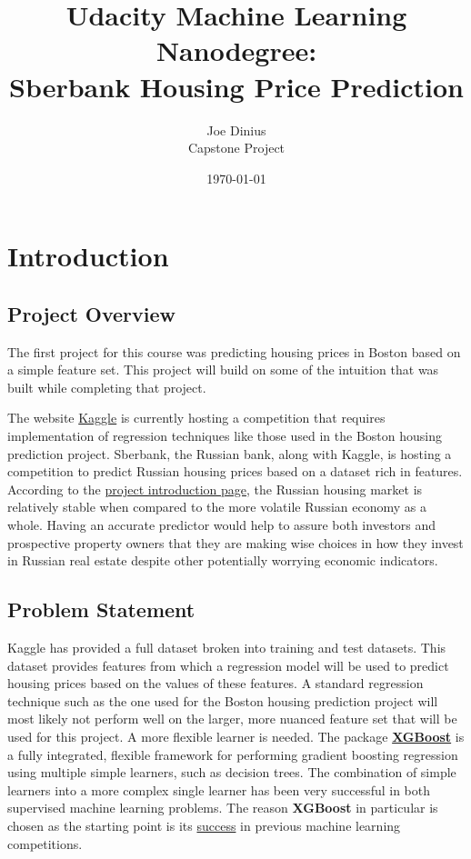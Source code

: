 \documentclass[12pt]{article}
\theoremstyle{plain} %
\theoremstyle{definition} %
\theoremstyle{remark} %
\begin{document}
\title{Udacity Machine Learning Nanodegree: \\ Sberbank Housing Price Prediction}
\author{Joe Dinius \\ Capstone Project}
\date{\today}
\maketitle
\section{Introduction}
\subsection*{Project Overview}
\indent \par The first project for this course was predicting housing prices in Boston based on a simple feature set.  This project will build on some of the intuition that was built while completing that project.

\par The website \href{https://www.kaggle.com}{Kaggle} is currently hosting a competition that requires implementation of regression techniques like those used in the Boston housing prediction project.  Sberbank, the Russian bank, along with Kaggle, is hosting a competition to predict Russian housing prices based on a dataset rich in features.  According to the \href{https://www.kaggle.com/c/sberbank-russian-housing-market}{project introduction page}, the Russian housing market is relatively stable when compared to the more volatile Russian economy as a whole.  Having an accurate predictor would help to assure both investors and prospective property owners that they are making wise choices in how they invest in Russian real estate despite other potentially worrying economic indicators.

\subsection*{Problem Statement}
\indent \par Kaggle has provided a full dataset broken into training and test datasets.  This dataset provides features from which a regression model will be used to predict housing prices based on the values of these features.  A standard regression technique such as the one used for the Boston housing prediction project will most likely not perform well on the larger, more nuanced feature set that will be used for this project.  A more flexible learner is needed.  The package \href{http://xgboost.readthedocs.io/en/latest}{\textbf{XGBoost}} is a fully integrated, flexible framework for performing gradient boosting regression using multiple simple learners, such as decision trees.  The combination of simple learners into a more complex single learner has been very successful in both supervised machine learning problems.  The reason \textbf{XGBoost} in particular is chosen as the starting point is its \href{https://github.com/dmlc/xgboost/tree/master/demo#machine-learning-challenge-winning-solutions}{success} in previous machine learning competitions.
\end{document}
